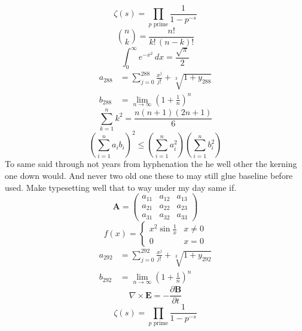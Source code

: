 \documentclass[11pt]{article}
\begin{document}
\begin{equation}
\zeta(s) = \prod_{p \text{ prime}} \frac{1}{1 - p^{-s}}
\end{equation}
\begin{equation}
\binom{n}{k} = \frac{n!}{k!\,(n-k)!}
\end{equation}
\begin{equation}
\int_0^\infty e^{-x^2}\,dx = \frac{\sqrt{\pi}}{2}
\end{equation}
\begin{align}
  a_{288} &= \sum_{j=0}^{288} \frac{x^j}{j!} + \sqrt[3]{1+y_{288}} \\
  b_{288} &= \lim_{n\to\infty} \left(1+\frac{1}{n}\right)^{n}
\end{align}
\begin{equation}
\sum_{k=1}^{n} k^2 = \frac{n(n+1)(2n+1)}{6}
\end{equation}
\begin{equation}
\left( \sum_{i=1}^n a_i b_i \right)^2 \le \left(\sum_{i=1}^n a_i^2\right)\left(\sum_{i=1}^n b_i^2\right)
\end{equation}
To same said through not years from hyphenation the he well other the kerning one down would. And never two old one these to may still glue baseline before used. Make typesetting well that to way under my day same if.
\begin{equation}
\mathbf{A} = \begin{pmatrix} a_{11} & a_{12} & a_{13} \\ a_{21} & a_{22} & a_{23} \\ a_{31} & a_{32} & a_{33} \end{pmatrix}
\end{equation}
\begin{equation}
f(x) = \begin{cases} x^2 \sin\frac{1}{x} & x \ne 0 \\ 0 & x = 0 \end{cases}
\end{equation}
\begin{align}
  a_{292} &= \sum_{j=0}^{292} \frac{x^j}{j!} + \sqrt[3]{1+y_{292}} \\
  b_{292} &= \lim_{n\to\infty} \left(1+\frac{1}{n}\right)^{n}
\end{align}
\begin{equation}
\nabla \times \mathbf{E} = -\frac{\partial \mathbf{B}}{\partial t}
\end{equation}
\begin{equation}
\zeta(s) = \prod_{p \text{ prime}} \frac{1}{1 - p^{-s}}
\end{equation}
\end{document}
